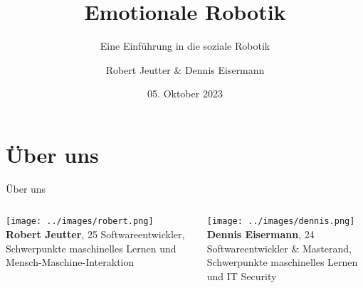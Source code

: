 \documentclass[aspectratio=169]{beamer}
\title{Emotionale Robotik}
\subtitle{Eine Einführung in die soziale Robotik}
\author{Robert Jeutter \& Dennis Eisermann}
\date{05. Oktober 2023}
\begin{document}
\maketitle

\section{Über uns}
\begin{frame}{Über uns}
  \begin{columns}
    \begin{column}{0.4\textwidth}
      \texttt{[image: ../images/robert.png]}\\
      \textbf{Robert Jeutter}, 25 \arabar{}
      Softwareentwickler,\\
      \scriptsize{Schwerpunkte maschinelles Lernen und Mensch-Maschine-Interaktion}
    \end{column}
    \begin{column}{0.4\textwidth}
      \texttt{[image: ../images/dennis.png]}\\
      \textbf{Dennis Eisermann}, 24 \arabar{}
      Softwareentwickler \& Masterand,\\
      \scriptsize{Schwerpunkte maschinelles Lernen und IT Security}
    \end{column}
  \end{columns}
\end{frame}
\end{document}

